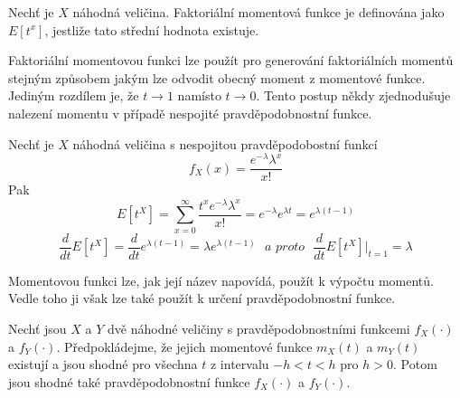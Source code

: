 \begin{definition}
Nechť je $X$ náhodná veličina. Faktoriální momentová funkce je definována jako $E[t^x]$, jestliže tato střední hodnota existuje.
\end{definition}

Faktoriální momentovou funkci lze použít pro generování faktoriálních momentů stejným způsobem jakým lze odvodit obecný moment z momentové funkce. Jediným rozdílem je, že $t \rightarrow 1$ namísto $t \rightarrow 0$. Tento postup někdy zjednodušuje nalezení momentu v případě nespojité pravděpodobnostní funkce.

\begin{example}
Nechť je $X$ náhodná veličina s nespojitou pravděpodobostní funkcí
\begin{equation*}
f_X(x) = \frac{e^{-\lambda}\lambda^x}{x!}
\end{equation*}
Pak
\begin{equation*}
E[t^X] = \sum_{x = 0}^{\infty} \frac{t^x e^{-\lambda} \lambda^x}{x!} = e^{-\lambda} e^{\lambda t} = e^{\lambda(t - 1)}
\end{equation*}
\begin{equation*}
\frac{d}{dt}E[t^X] = \frac{d}{dt} e^{\lambda(t-1)}=\lambda e^{\lambda (t - 1)}~~~\textit{a proto}~~~\frac{d}{dt}E[t^X] \Big|_{t = 1} = \lambda
\end{equation*}
\end{example}

Momentovou funkci lze, jak její název napovídá, použít k výpočtu momentů. Vedle toho ji však lze také použít k určení pravděpodobnostní funkce.

\begin{theorem}
Nechť jsou $X$ a $Y$ dvě náhodné veličiny s pravděpodobnostními funkcemi $f_X(\cdot)$ a $f_Y(\cdot)$. Předpokládejme, že jejich momentové funkce $m_X(t)$ a $m_Y(t)$ existují a jsou shodné pro všechna $t$ z intervalu $-h < t < h$ pro $h > 0$. Potom jsou shodné také pravděpodobnostní funkce $f_X(\cdot)$ a $f_Y(\cdot)$.
\end{theorem}
